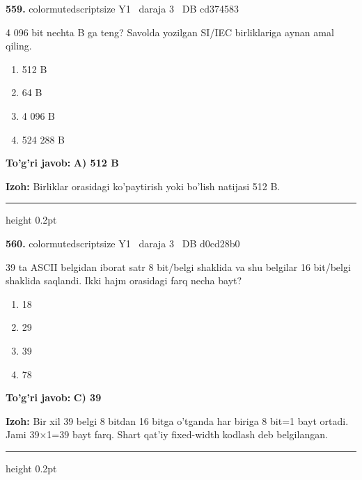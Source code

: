 \documentclass[10pt,a4paper,oneside]{article}
\begin{document}
\noindent\textbf{\color{ink}559.}  {color{muted}scriptsize Y1 \textbullet\ daraja 3 \textbullet\ DB cd374583}
\par
4 096 bit nechta B ga teng? Savolda yozilgan SI/IEC birliklariga aynan amal qiling.
\begin{enumerate}[label=\Alph*),leftmargin=9mm]
\item 512 B
\item 64 B
\item 4 096 B
\item 524 288 B
\end{enumerate}
\begin{tcolorbox}[enhanced,breakable,colback=teal!4,colframe=teal!50!black,boxrule=0.5pt,arc=1.1mm,left=3mm,right=3mm,top=1.7mm,bottom=1.7mm,before skip=2mm,after skip=2mm]
\textbf{\color{teal}To'g'ri javob:} \textbf{A) 512 B}
\par\smallskip
\textbf{Izoh:} Birliklar orasidagi ko'paytirish yoki bo'lish natijasi 512 B.
\end{tcolorbox}
\vspace{2mm}\hrule height 0.2pt \vspace{3mm}

\noindent\textbf{\color{ink}560.}  {color{muted}scriptsize Y1 \textbullet\ daraja 3 \textbullet\ DB d0cd28b0}
\par
39 ta ASCII belgidan iborat satr 8 bit/belgi shaklida va shu belgilar 16 bit/belgi shaklida saqlandi. Ikki hajm orasidagi farq necha bayt?
\begin{enumerate}[label=\Alph*),leftmargin=9mm]
\item 18
\item 29
\item 39
\item 78
\end{enumerate}
\begin{tcolorbox}[enhanced,breakable,colback=teal!4,colframe=teal!50!black,boxrule=0.5pt,arc=1.1mm,left=3mm,right=3mm,top=1.7mm,bottom=1.7mm,before skip=2mm,after skip=2mm]
\textbf{\color{teal}To'g'ri javob:} \textbf{C) 39}
\par\smallskip
\textbf{Izoh:} Bir xil 39 belgi 8 bitdan 16 bitga o'tganda har biriga 8 bit=1 bayt ortadi. Jami 39\ensuremath{\times}1=39 bayt farq. Shart qat'iy fixed-width kodlash deb belgilangan.
\end{tcolorbox}
\vspace{2mm}\hrule height 0.2pt \vspace{3mm}
\end{document}

